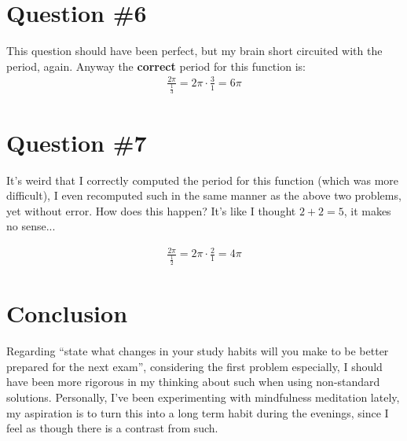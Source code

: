 \section*{Question \#6}

This question should have been perfect, but my brain short circuited with the period, again. Anyway the \textbf{correct} period for this function is:
\begin{equation}
\begin{split}
\frac{2\pi}{\frac{1}{3}} = 2\pi \cdot \frac{3}{1} = 6\pi
\end{split}
\end{equation}


\section*{Question \#7}

It's weird that I correctly computed the period for this function (which was more difficult), I even recomputed such in the same manner as the above two problems, yet without error. How does this happen? It's like I thought $2+2 = 5$, it makes no sense... 


\begin{equation}
\begin{split}
\frac{2\pi}{\frac{1}{2}} = 2\pi \cdot \frac{2}{1} = 4\pi
\end{split}
\end{equation}

\section*{Conclusion}

Regarding ``state what changes in your study habits will you make to be better prepared for the next exam'', considering the first problem especially, I should have been more rigorous in my thinking about such when using non-standard solutions. Personally, I’ve been experimenting with mindfulness meditation lately, my aspiration is to turn this into a long term habit during the evenings, since I feel as though there is a contrast from such. 


